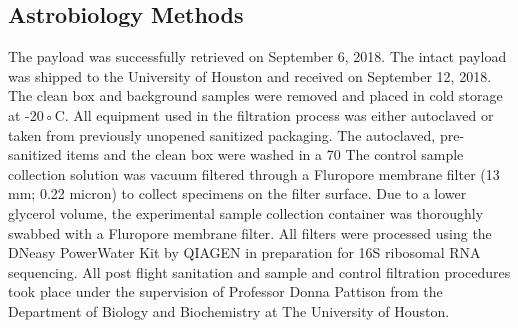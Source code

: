 \subsection{Astrobiology Methods}
\label{sec:Astrobiology Methods}
The payload was successfully retrieved on September 6, 2018. The intact payload was shipped to the University of Houston and received on September 12, 2018. The clean box and background samples were removed and placed in cold storage at -20◦C. All equipment used in the filtration process was either autoclaved or taken from previously unopened sanitized packaging. The autoclaved, pre-sanitized items and the clean box were washed in a 70 %
The control sample collection solution was vacuum filtered through a Fluropore membrane filter (13 mm; 0.22 micron) to collect specimens on the filter surface. Due to a lower glycerol volume, the experimental sample collection container was thoroughly swabbed with a Fluropore membrane filter. All filters were processed using the DNeasy PowerWater Kit by QIAGEN in preparation for 16S ribosomal RNA sequencing. All post flight sanitation and sample and control filtration procedures took place under the supervision of Professor Donna Pattison from the Department of
Biology and Biochemistry at The University of Houston.
